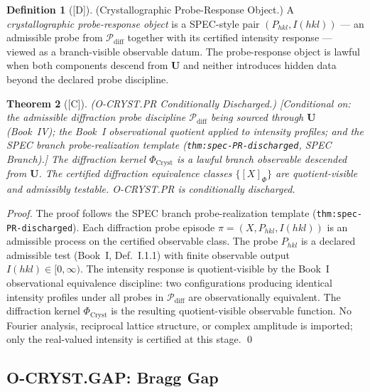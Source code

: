 \documentclass[12pt,oneside]{amsbook}
\theoremstyle{plain}
\newtheorem{theorem}{Theorem}[section]
\theoremstyle{definition}
\newtheorem{definition}[theorem]{Definition}
\theoremstyle{remark}
\newcommand{\status}[1]{\textup{[#1]}}
\begin{document}
\begin{definition}[\status{D}]\label{def:cryst-probe-response-object}
\textup{(Crystallographic Probe-Response Object.)}
A \emph{crystallographic probe-response object} is a SPEC-style
pair $(P_{hkl}, I(hkl))$ --- an admissible probe from
$\mathcal{P}_{\mathrm{diff}}$ together with its certified intensity
response --- viewed as a branch-visible observable datum.  The
probe-response object is lawful when both components descend from
$\mathbf{U}$ and neither introduces hidden data beyond the declared
probe discipline.
\end{definition}

\begin{theorem}[\status{C}]\label{thm:cryst-PR-discharged}
\textup{(O-CRYST.PR Conditionally Discharged.)}
\textup{[Conditional on: the admissible diffraction probe discipline
$\mathcal{P}_{\mathrm{diff}}$ being sourced through $\mathbf{U}$
(Book~IV); the Book~I observational quotient applied to intensity
profiles; and the SPEC branch probe-realization template
(\texttt{thm:spec-PR-discharged}, SPEC Branch).]}
The diffraction kernel $\Phi_{\mathrm{Cryst}}$ is a lawful branch
observable descended from $\mathbf{U}$.  The certified diffraction
equivalence classes $\{[X]_{\Phi}\}$ are quotient-visible and
admissibly testable.  O-CRYST.PR is conditionally discharged.
\end{theorem}

\begin{proof}
The proof follows the SPEC branch probe-realization template
(\texttt{thm:spec-PR-discharged}).  Each diffraction probe episode
$\pi = (X, P_{hkl}, I(hkl))$ is an admissible process on the
certified observable class.  The probe $P_{hkl}$ is a declared
admissible test (Book~I, Def.~I.1.1) with finite observable output
$I(hkl) \in [0,\infty)$.  The intensity response is quotient-visible
by the Book~I observational equivalence discipline: two configurations
producing identical intensity profiles under all probes in
$\mathcal{P}_{\mathrm{diff}}$ are observationally equivalent.  The
diffraction kernel $\Phi_{\mathrm{Cryst}}$ is the resulting
quotient-visible observable function.  No Fourier analysis, reciprocal
lattice structure, or complex amplitude is imported; only the
real-valued intensity is certified at this stage.
\qed
\end{proof}

\subsection{O-CRYST.GAP: Bragg Gap}
\label{sec:cryst-GAP-discharge}
\end{document}
